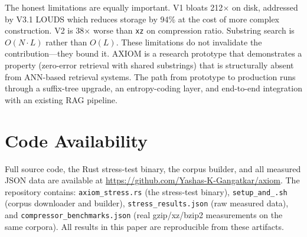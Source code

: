 \documentclass[conference]{IEEEtran}
\begin{document}
The honest limitations are equally important. V1 bloats 212$\times$ on disk, addressed by V3.1 LOUDS which reduces storage by 94\% at the cost of more complex construction. V2 is 38$\times$ worse than \texttt{xz} on compression ratio. Substring search is $O(N{\cdot}L)$ rather than $O(L)$. These limitations do not invalidate the contribution---they bound it. AXIOM is a research prototype that demonstrates a property (zero-error retrieval with shared substrings) that is structurally absent from ANN-based retrieval systems. The path from prototype to production runs through a suffix-tree upgrade, an entropy-coding layer, and end-to-end integration with an existing RAG pipeline.

\section*{Code Availability}

Full source code, the Rust stress-test binary, the corpus builder, and all measured JSON data are available at \url{https://github.com/Yashas-K-Gangatkar/axiom}. The repository contains: \texttt{axiom\_stress.rs} (the stress-test binary), \texttt{setup\_and\_.sh} (corpus downloader and builder), \texttt{stress\_results.json} (raw measured data), and \texttt{compressor\_benchmarks.json} (real gzip/xz/bzip2 measurements on the same corpora). All results in this paper are reproducible from these artifacts.
\end{document}
